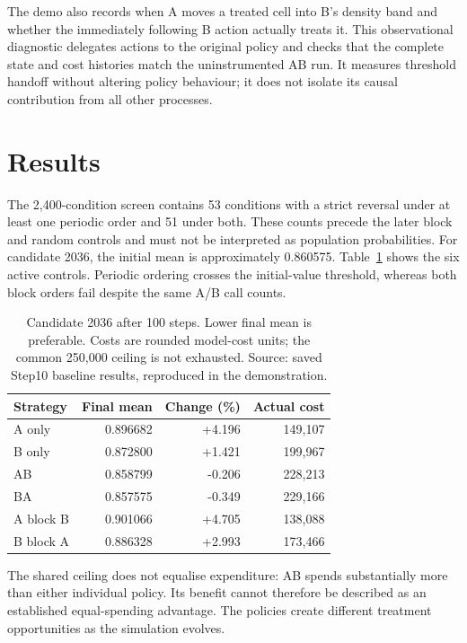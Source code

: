 \documentclass[a4paper,11pt]{article}
\begin{document}
The demo also records when A moves a treated cell into B's density band and whether the immediately following B action actually treats it. This observational diagnostic delegates actions to the original policy and checks that the complete state and cost histories match the uninstrumented AB run. It measures threshold handoff without altering policy behaviour; it does not isolate its causal contribution from all other processes.

\newpage
\section{Results}
The 2,400-condition screen contains 53 conditions with a strict reversal under at least one periodic order and 51 under both. These counts precede the later block and random controls and must not be interpreted as population probabilities. For candidate 2036, the initial mean is approximately 0.860575. Table~\ref{tab:main} shows the six active controls. Periodic ordering crosses the initial-value threshold, whereas both block orders fail despite the same A/B call counts.

\begin{table}[h]
\centering
\begin{tabular}{lrrr}
\toprule
Strategy & Final mean & Change (\%) & Actual cost\\
\midrule
A only & 0.896682 & +4.196 & 149,107\\
B only & 0.872800 & +1.421 & 199,967\\
AB & 0.858799 & -0.206 & 228,213\\
BA & 0.857575 & -0.349 & 229,166\\
A block B & 0.901066 & +4.705 & 138,088\\
B block A & 0.886328 & +2.993 & 173,466\\
\bottomrule
\end{tabular}
\caption{Candidate 2036 after 100 steps. Lower final mean is preferable. Costs are rounded model-cost units; the common 250,000 ceiling is not exhausted. Source: saved Step10 baseline results, reproduced in the demonstration.}
\label{tab:main}
\end{table}

The shared ceiling does not equalise expenditure: AB spends substantially more than either individual policy. Its benefit cannot therefore be described as an established equal-spending advantage. The policies create different treatment opportunities as the simulation evolves.
\end{document}
